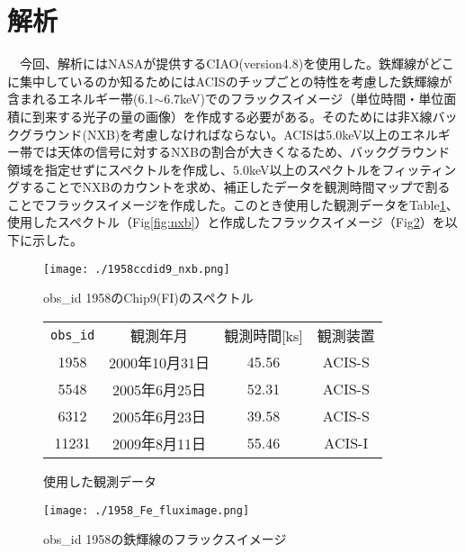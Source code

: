 \documentclass[10pt]{article}
\begin{document}
\section{{\normalsize 解析}}
~~今回、解析にはNASAが提供するCIAO(version4.8)を使用した。鉄輝線がどこに集中しているのか知るためにはACISのチップごとの特性を考慮した鉄輝線が含まれるエネルギー帯(6.1$\sim$6.7keV)でのフラックスイメージ（単位時間・単位面積に到来する光子の量の画像）を作成する必要がある。そのためには非X線バックグラウンド(NXB)を考慮しなければならない。ACISは5.0keV以上のエネルギー帯では天体の信号に対するNXBの割合が大きくなるため、バックグラウンド領域を指定せずにスペクトルを作成し、5.0keV以上のスペクトルをフィッティングすることでNXBのカウントを求め、補正したデータを観測時間マップで割ることでフラックスイメージを作成した。このとき使用した観測データをTable\ref{tb:obs}、使用したスペクトル（Fig\ref{fig:nxb}）と作成したフラックスイメージ（Fig\ref{fig:Fe}）を以下に示した。

\begin{figure}[h]
\begin{minipage}{0.5\textwidth}
\begin{center}
\texttt{[image: ./1958ccdid9\_nxb.png]}
\caption{obs\_id 1958のChip9(FI)のスペクトル}
\label{fig:nxb}
\end{center}
\end{minipage}
\begin{minipage}{0.3\textwidth}
\begin{center}
\makeatletter
\def\@captype{table}
\makeatother
\begin{tabular}{cccc}
\hline
\verb#obs_id#  & 観測年月 &   観測時間[ks] &   観測装置\\
1958   &    2000年10月31日 &   45.56 &   ACIS-S\\
5548   &    2005年6月25日  &    52.31    & ACIS-S\\
6312    &   2005年6月23日   &   39.58  &  ACIS-S\\
11231  &   2009年8月11日   &    55.46 &  ACIS-I\\
\hline
\end{tabular}
 \caption{使用した観測データ}
\label{tb:obs}
\end{center}
\end{minipage}
\end{figure}

\begin{figure}[h]
\begin{center}
\texttt{[image: ./1958\_Fe\_fluximage.png]}
\caption{obs\_id 1958の鉄輝線のフラックスイメージ}
\label{fig:Fe}
 \end{center}
\end{figure}
\end{document}
